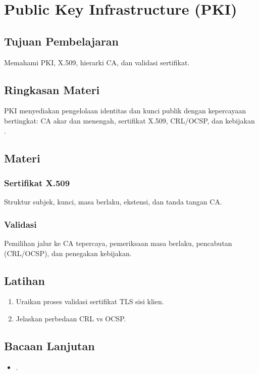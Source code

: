 \documentclass[../main.tex]{subfiles}
\begin{document}
\chapter{Public Key Infrastructure (PKI)}
\section{Tujuan Pembelajaran}
Memahami PKI, X.509, hierarki CA, dan validasi sertifikat.

\section{Ringkasan Materi}
PKI menyediakan pengelolaan identitas dan kunci publik dengan kepercayaan bertingkat: CA akar dan menengah, sertifikat X.509, CRL/OCSP, dan kebijakan \citep{rfc5280}.

\section{Materi}
\subsection{Sertifikat X.509}
Struktur subjek, kunci, masa berlaku, ekstensi, dan tanda tangan CA.

\subsection{Validasi}
Pemilihan jalur ke CA tepercaya, pemeriksaan masa berlaku, pencabutan (CRL/OCSP), dan penegakan kebijakan.

\section{Latihan}
\begin{enumerate}
  \item Uraikan proses validasi sertifikat TLS sisi klien.
  \item Jelaskan perbedaan CRL vs OCSP.
\end{enumerate}

\section{Bacaan Lanjutan}
\begin{itemize}
  \item \citep{rfc5280}.
\end{itemize}
\end{document}
